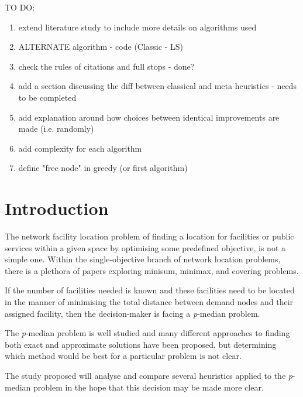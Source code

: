 \documentclass[11pt]{article}
\newcommand{\np}{\newpage}
\begin{document}
	TO DO:
	\begin{enumerate}
		\item extend literature study to include more details on algorithms used
		
		\item ALTERNATE algorithm - code (Classic - LS)
		
		\item check the rules of citations and full stops - done?
		
		\item add a section discussing the diff between classical and meta heuristics - needs to be completed
		
		\item add explanation around how choices between identical improvements are made (i.e. randomly) 
		
		\item add complexity for each algorithm
		
		\item define "free node" in greedy (or first algorithm)

		
	\end{enumerate}
	\thispagestyle{empty}
	\np
	
	\tableofcontents
	\thispagestyle{empty}
	\np

\setcounter{page}{1}		
	\section{Introduction}
	The network facility location problem of finding a location for facilities or public services within a given space by optimising some predefined objective, is not a simple one.  Within the single-objective branch of network location problems, there is a plethora of papers exploring minisum, minimax, and covering problems.
	
	If the number of facilities needed is known and these facilities need to be located in the manner of minimising the total distance between demand nodes and their assigned facility, then the decision-maker is facing a \emph{p}-median problem.
	
	The \emph{p}-median problem  is well studied and many different approaches to finding both exact and approximate solutions have been proposed, but determining which method would be best for a particular problem is not clear.
	
	The study proposed will analyse and compare several heuristics applied to the \emph{p}-median problem in the hope that this decision may be made more clear.	
	
\end{document}
